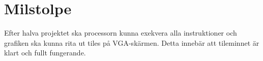\documentclass[a4paper,titlepage]{article}
\begin{document}
\section{Milstolpe}
Efter halva projektet ska processorn kunna exekvera alla instruktioner och
grafiken ska kunna rita ut tiles på VGA-skärmen. Detta innebär att tileminnet
är klart och fullt fungerande.
% 
\end{document}
